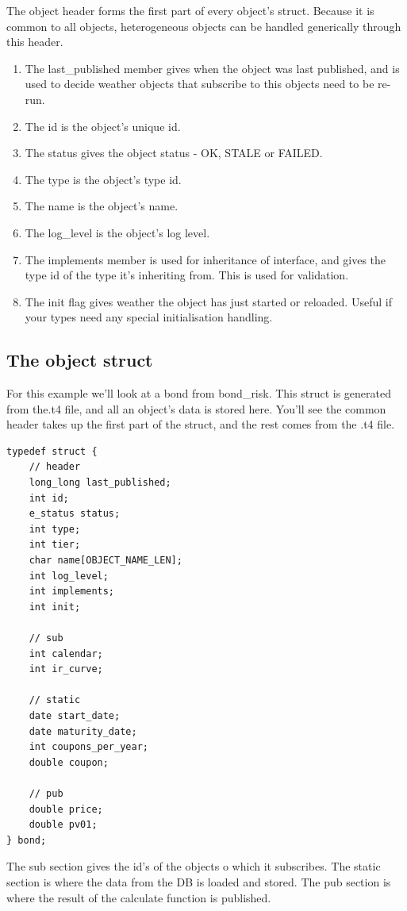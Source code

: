 \documentclass{report}
\begin{document}
The object header forms the first part of every object's struct. Because it is common to all objects, heterogeneous objects can be handled generically through this header.


\begin{enumerate}
\item The last_published member gives when the object was last published, and is used to decide weather objects that subscribe to this objects need to be re-run.
\item The id is the object's unique id.
\item The status gives the object status - OK, STALE or FAILED.
\item The type is the object's type id.
\item The name is the object's name.
\item The log_level is the object's log level.
\item The implements member is used for inheritance of interface, and gives the type id of the type it's inheriting from. This is used for validation.
\item The init flag gives weather the object has just started or reloaded. Useful if your types need any special initialisation handling.
\end{enumerate}

\subsection{The object struct}

For this example we'll look at a bond from bond_risk. This struct is generated from the.t4 file, and all an object's data is stored here. You'll see the common header takes up the first part of the struct, and the rest comes from the .t4 file.

\begin{verbatim}
typedef struct {
    // header
    long_long last_published;
    int id;
    e_status status;
    int type;
    int tier;
    char name[OBJECT_NAME_LEN];
    int log_level;
    int implements;
    int init;

    // sub
    int calendar;
    int ir_curve;

    // static
    date start_date;
    date maturity_date;
    int coupons_per_year;
    double coupon;

    // pub
    double price;
    double pv01;
} bond;
\end{verbatim}

The sub section gives the id's of the objects o which it subscribes. The static section is where the data from the DB is loaded and stored. The pub section is where the result of the calculate function is published.
\end{document}
